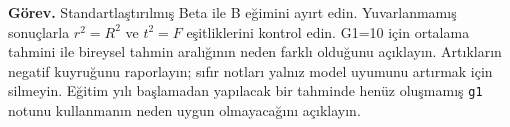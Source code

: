 \textbf{Görev.} Standartlaştırılmış Beta ile B eğimini ayırt edin.
Yuvarlanmamış sonuçlarla $r^2=R^2$ ve $t^2=F$ eşitliklerini kontrol
edin. G1=10 için ortalama tahmini ile bireysel tahmin aralığının
neden farklı olduğunu açıklayın. Artıkların negatif kuyruğunu
raporlayın; sıfır notları yalnız model uyumunu artırmak için silmeyin.
Eğitim yılı başlamadan yapılacak bir tahminde henüz oluşmamış \texttt{g1}
notunu kullanmanın neden uygun olmayacağını açıklayın.